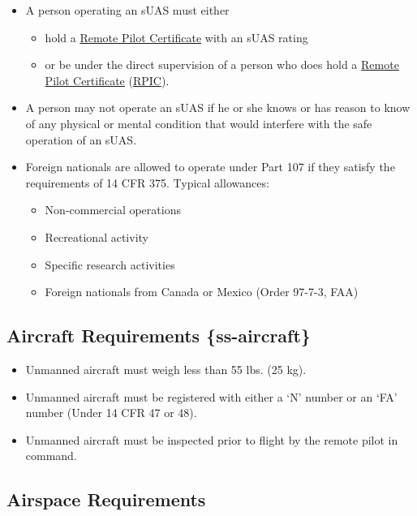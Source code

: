 \documentclass[
]{book}
\providecommand{\tightlist}{%
  \setlength{\itemsep}{0pt}\setlength{\parskip}{0pt}}
\begin{document}
\begin{itemize}
\item
  A person operating an sUAS must either

  \begin{itemize}
  \tightlist
  \item
    hold a \protect\hyperlink{RPC}{Remote Pilot Certificate} with an sUAS rating
  \item
    or be under the direct supervision of a person who does hold a \protect\hyperlink{RPC}{Remote Pilot Certificate} (\protect\hyperlink{RPIC}{RPIC}).
  \end{itemize}
\item
  A person may not operate an sUAS if he or she knows or has reason to know of any physical or mental condition that would interfere with the safe operation of an sUAS.
\item
  Foreign nationals are allowed to operate under Part 107 if they satisfy the requirements of 14 CFR 375. Typical allowances:

  \begin{itemize}
  \tightlist
  \item
    Non-commercial operations
  \item
    Recreational activity
  \item
    Specific research activities
  \item
    Foreign nationals from Canada or Mexico (Order 97-7-3, FAA)
  \end{itemize}
\end{itemize}

\hypertarget{aircraft-requirements-ss-aircraft}{%
\subsection{Aircraft Requirements \{ss-aircraft\}}\label{aircraft-requirements-ss-aircraft}}

\begin{itemize}
\tightlist
\item
  Unmanned aircraft must weigh less than 55 lbs. (25 kg).
\item
  Unmanned aircraft must be registered with either a `N' number or an `FA' number (Under 14 CFR 47 or 48).
\item
  Unmanned aircraft must be inspected prior to flight by the remote pilot in command.
\end{itemize}

\hypertarget{airspace-requirements}{%
\subsection{Airspace Requirements}\label{airspace-requirements}}
\end{document}
